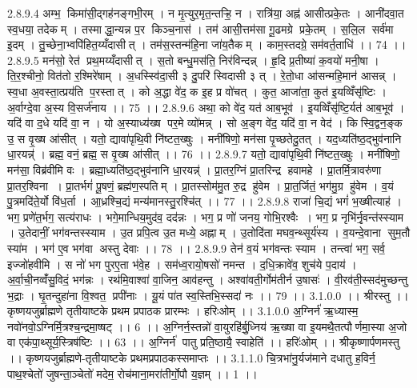 2.8.9.4
अम्भ॒ किमा॑सी॒द्गह॑नङ्गभी॒रम् । न मृ॒त्युर॒मृत॒न्तऱ्हि॒ न । रात्रि॑या॒ अह्न॑ आसीत्प्रके॒तः । आनी॑दवा॒त स्व॒धया॒ तदेकम् । तस्माद्धा॒न्यन्न प॒र किञ्च॒नास॑ । तम॑ आसी॒त्तम॑सा गू॒ढमग्रे प्रके॒तम् । स॒लि॒ल सर्व॑मा इ॒दम् । तु॒च्छेना॒भ्वपि॑हित॒य्यँदासीत् । तम॑स॒स्तन्म॑हि॒ना जा॑य॒तैकम् । काम॒स्तदग्रे॒ सम॑वर्त॒ताधि॑ ।। 74 ।।
2.8.9.5
मन॑सो॒ रेत॑ प्रथ॒मय्यँदासीत् । स॒तो बन्धु॒मस॑ति॒ निर॑विन्दन्न् । हृ॒दि प्र॒तीष्या॑ क॒वयो॑ मनी॒षा । ति॒र॒श्चीनो॒ वित॑तो र॒श्मिरे॑षाम् । अ॒धस्स्वि॑दा॒सी ३ दु॒परि॑ स्विदासी ३ त् । रे॒तो॒धा आ॑सन्महि॒मान॑ आसन्न् । स्व॒धा अ॒वस्ता॒त्प्रय॑ति प॒रस्तात् । को अ॒द्धा वे॑द॒ क इ॒ह प्र वो॑चत् । कुत॒ आजा॑ता॒ कुत॑ इ॒यव्विँसृ॑ष्टिः । अ॒र्वाग्दे॒वा अ॒स्य वि॒सर्ज॑नाय ।। 75 ।।
2.8.9.6
अथा॒ को वे॑द॒ यत॑ आब॒भूव॑ । इ॒यव्विँसृ॑ष्टि॒र्यत॑ आब॒भूव॑ । यदि॑ वा द॒धे यदि॑ वा॒ न । यो अ॒स्याध्य॑ख्ष पर॒मे व्यो॑मन्न् । सो अ॒ङ्ग वे॑द॒ यदि॑ वा॒ न वेद॑ । किस्वि॒द्वन॒ङ्क उ॒ स वृ॒ख्ष आ॑सीत् । यतो॒ द्यावा॑पृथि॒वी नि॑ष्टत॒ख्षुः । मनी॑षिणो॒ मन॑सा पृ॒च्छतेदु॒तत् । यद॒ध्यति॑ष्ठ॒द्भुव॑नानि धा॒रयन्न्॑ । ब्रह्म॒ वनं॒ ब्रह्म॒ स वृ॒ख्ष आ॑सीत् ।। 76 ।।
2.8.9.7
यतो॒ द्यावा॑पृथि॒वी नि॑ष्टत॒ख्षुः । मनी॑षिणो॒ मन॑सा॒ विब्र॑वीमि वः । ब्रह्मा॒ध्यति॑ष्ठ॒द्भुव॑नानि धा॒रयन्न्॑ । प्रा॒तर॒ग्निं प्रा॒तरिन्द्र॑ हवामहे । प्रा॒तर्मि॒त्रावरु॑णा प्रा॒तर॒श्विना । प्रा॒तर्भगं॑ पू॒षणं॒ ब्रह्म॑ण॒स्पतिम् । प्रा॒तस्सोम॑मु॒त रु॒द्र हु॑वेम । प्रा॒त॒र्जितं॒ भग॑मु॒ग्र हु॑वेम । व॒यं पु॒त्रमदि॑ते॒र्यो वि॑ध॒र्ता । आ॒ध्रश्चि॒द्यं मन्य॑मानस्तु॒रश्चि॑त् ।। 77 ।।
2.8.9.8
राजा॑ चि॒द्यं भगं॑ भ॒ख्षीत्याह॑ । भग॒ प्रणे॑त॒र्भग॒ सत्य॑राधः । भगे॒मान्धिय॒मुद॑व॒ दद॑न्नः । भग॒ प्र णो॑ जनय॒ गोभि॒रश्वैः । भग॒ प्र नृभि॑र्नृ॒वन्त॑स्स्याम । उ॒तेदानीं॒ भग॑वन्तस्स्याम । उ॒त प्रपि॒त्व उ॒त मध्ये॒ अह्नाम् । उ॒तोदि॑ता मघव॒न्थ्सूर्य॑स्य । व॒यन्दे॒वाना॑ सुम॒तौ स्या॑म । भग॑ ए॒व भग॑वा अस्तु देवाः ।। 78 ।।
2.8.9.9
तेन॑ व॒यं भग॑वन्तः स्याम । तन्त्वा॑ भग॒ सर्व॒ इज्जो॑हवीमि । स नो॑ भग पुरए॒ता भ॑वे॒ह । सम॑ध्व॒रायो॒षसो॑ नमन्त । द॒धि॒क्रावे॑व॒ शुच॑ये प॒दाय॑ । अ॒र्वा॒ची॒नव्वँ॑सु॒विदं॒ भग॑न्नः । रथ॑मि॒वाश्वा॑ वा॒जिन॒ आव॑हन्तु । अश्वा॑वती॒र्गोम॑तीर्न उ॒षासः॑ । वी॒रव॑ती॒स्सद॑मुच्छन्तु भ॒द्राः । घृ॒तन्दुहा॑ना वि॒श्वत॒ प्रपी॑नाः । यू॒यं पा॑त स्व॒स्तिभि॒स्सदा॑ नः ।। 79 ।।
3.1.0.0
।। श्रीरस्तु ।। कृष्णयजुर्ब्राह्मणे तृतीयाष्टके प्रथम प्रपाठक प्रारम्भः । हरिःओम् ।।
3.1.0.0
अ॒ग्निर्न॑ ऋ॒ध्यास्म॒ नवो॑नवो॒ऽग्निर्मि॒त्रश्च॒न्द्रमा॒ष्षट् ।। 6 ।। अ॒ग्निर्न॒स्तन्नो॑ वा॒युरहि॑र्बु॒ध्निय॑ ऋ॒ख्षा वा इ॒यमथै॒तत्पौर्णमा॒स्या अ॒जो वा एक॑पा॒थ्सूर्य॒स्त्रिष॑ष्टिः ।। 63 ।। अ॒ग्निर्न॑ पातु प्रति॒ष्ठायै॒ स्वाहेति॑ ।। हरिः॑ओम् ।। श्रीकृष्णार्पणमस्तु ।। कृष्णयजुर्ब्राह्मणे-तृतीयाष्टके प्रथमप्रपाठकस्समाप्तः ।।
3.1.1.0
चि॒त्रभा॑नु॒र्यज॑माने दधातु ह॒विर्न॒ पाथ॒श्चेतो॑ जुषन्ता॒ञ्चेतो॑ मदेम॒ रोच॑माना॒मरा॑तीर्गो॒पौ य॒ज्ञम् ।। 1 ।।
